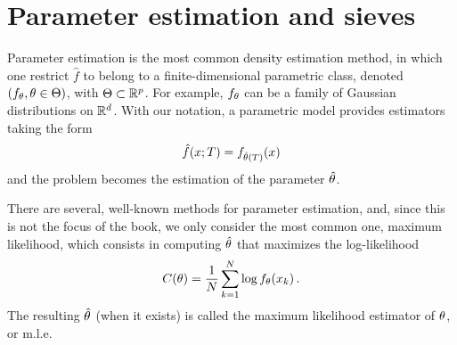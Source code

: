 


\section{Parameter estimation and sieves}
\label{sec:sieves} 
Parameter estimation is the most common density estimation method, in which one restrict $\hat f$ to belong to
a finite-dimensional parametric class, denoted $(f_\theta, \theta\in\Theta)$, with $\Theta\subset
{\mathbb{R}}^p$. For example, $f_\theta$ can be a family of Gaussian distributions
on ${\mathbb{R}}^d$. With our notation, a parametric model provides estimators taking the form
\[
{\hat{f}}(x; T) = f_{\hat{\theta}(T)}(x)
\]
and the problem becomes the estimation of the parameter $\hat{\theta}$.


There are several, well-known methods for parameter
estimation, and, since this is not the focus of the book, we only
consider the most common one, maximum likelihood, which consists in
computing ${\hat{\theta}}$ that maximizes the log-likelihood
\begin{equation}
\label{eq:log.lik}
C(\theta) = \frac{1}{N}\sum_{k=1}^N \log f_\theta(x_k)\,.
\end{equation}
The resulting ${\hat{\theta}}$ (when it exists) is called the maximum likelihood estimator of $\theta$, or m.l.e.


